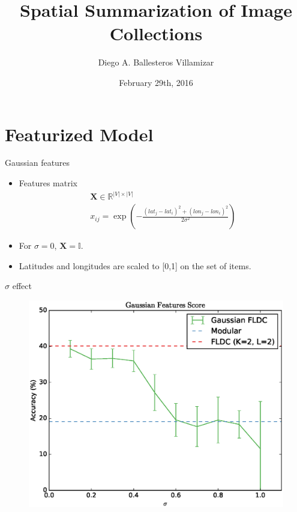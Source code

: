 \documentclass{beamer}
\title[M.Sc. Thesis 2015]{Spatial Summarization of Image Collections}
\author{Diego A. Ballesteros Villamizar}
\institute[ETHZ]{ETH Zürich}
\date{February 29th, 2016}
\begin{document}
\begin{frame}
  \titlepage
\end{frame}

\section{Featurized Model}

\begin{frame}{Gaussian features}
  \begin{itemize}
    \item Features matrix
    \begin{align*}
    \mathbf{X} \in \mathbb{R}^{|V| \times |V|} \\
    x_{ij} = \exp{\left(-\frac{\left({lat}_{j} - {lat}_{i}\right)^2 + \left({lon}_{j} - {lon}_{i}\right)^2}{2 \sigma^{2}}\right)}
    \end{align*}
    \item For $\sigma = 0$, $\mathbf{X} = \mathbb{I}$.
    \item Latitudes and longitudes are scaled to [0,1] on the set of items.
  \end{itemize}
\end{frame}

\begin{frame}{$\sigma$ effect}
  \begin{figure}
    \centering
    \includegraphics[height=0.8\textheight]{gaussian_features_score}
  \end{figure}
\end{frame}
\end{document}
